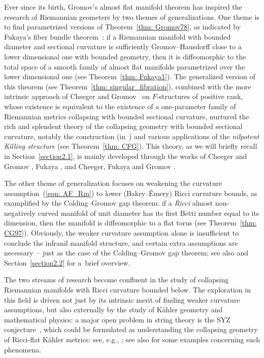\documentclass[pdftex]{sigma}
\numberwithin{equation}{section}
\begin{document}
Ever since its birth, Gromov's almost flat manifold theorem has inspired the
research of Riemannian geometers by two themes of generalizations. One theme
is to find parametrized versions of Theorem~\ref{thm: Gromov78}, as indicated by
Fukaya's fiber bundle theorem~\cite{Fukaya87ld}: if a Riemannian manifold with
bounded diameter and sectional curvature is sufficiently Gromov--Hausdorff close
to a lower dimensional one with bounded geometry, then it is diffeomorphic to
the total space of a smooth family of almost flat manifolds parametrized over
the lower dimensional one (see Theorem~\ref{thm: Fukaya1}). The generalized
version of this theorem (see Theorem~\ref{thm: singular_fibration}), combined
with the more intrinsic approach of Cheeger and Gromov~\cite{CGI, CGII} on
$F$-structures of positive rank, whose existence is equivalent to the existence
of a one-parameter family of Riemannian metrics collapsing with bounded
sectional curvature, nurtured the rich and splendent theory of the collapsing
geometry with bounded sectional curvature, notably the construction (in~\cite{CFG92}) and various applications of the \emph{nilpotent Killing
structure} (see Theorem~\ref{thm: CFG}). This theory,
as we will briefly recall in Section~\ref{section2.1}, is mainly developed through the works of
Cheeger and Gromov \cite{CGI, CGII}, Fukaya \cite{Fukaya87mGH, Fukaya87ld,
Fukaya88, Fukaya89}, and Cheeger, Fukaya and Gromov \cite{CFG92}.

The other theme of generalization focuses on weakening the curvature assumption~(\ref{eqn: AF_Rm}) to lower (Bakry--\'Emery) Ricci curvature bounds, as
examplified by the Colding--Gromov gap theorem: if a \emph{Ricci} almost
non-negatively curved manifold of unit diameter has its first Betti number
equal to its dimension, then the manifold is diffeomorphic to a flat torus
(see Theorem~\ref{thm: CG97}). Obviously, the weaker curvature assumption alone
is insufficient to conclude the infranil manifold structure, and certain extra
assumptions are necessary~-- just as the case of the Colding--Gromov gap
theorem; see also \cite{DWY96, HKRX18, Kapovitch19, PWY99} and Section~\ref{section2.2} for a~brief overview.

The two streams of research become confluent in the study of collapsing
Riemannian manifolds with Ricci curvature bounded below. The exploration in
this field is driven not just by its intrinsic merit of finding weaker
curvature assumptions, but also externally by the study of K\"ahler
geometry and mathematical physics: a major open problem in string theory is the
SYZ conjecture~\cite{SYZ}, which could be formulated as understanding the
collapsing geometry of Ricci-flat K\"ahler metrics: see, e.g., \cite{KS01, Li19,
Tossatti20}; see also \cite{ GTZ13, GTZ16,GW00, HSVZ18} for some examples
concerning such phenomena.
\end{document}
